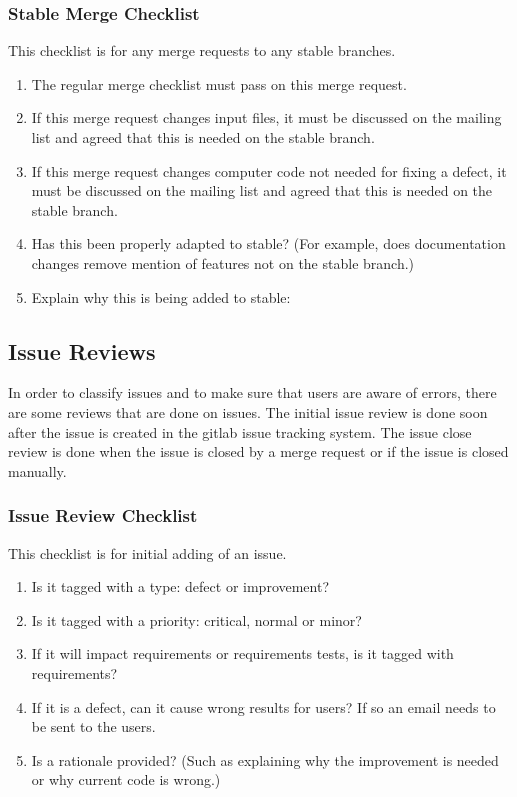 \documentclass{article}
\begin{document}
\subsubsection{Stable Merge Checklist}

This checklist is for any merge requests to any stable branches.

\begin{enumerate}
\item  The regular merge checklist must pass on this merge request.
\item  If this merge request changes input files, it must be discussed on the mailing list and agreed that this is needed on the stable branch.
\item  If this merge request changes computer code not needed for fixing a defect, it must be discussed on the mailing list and agreed that this is needed on the stable branch.
\item  Has this been properly adapted to stable? (For example, does documentation changes remove mention of features not on the stable branch.)
\item  Explain why this is being added to stable:
\end{enumerate}

\subsection{Issue Reviews}

In order to classify issues and to make sure that users are aware of
errors, there are some reviews that are done on issues.  The initial
issue review is done soon after the issue is created in the gitlab
issue tracking system.  The issue close review is done when the issue
is closed by a merge request or if the issue is closed manually.

\subsubsection{Issue Review Checklist}

This checklist is for initial adding of an issue.

\begin{enumerate}
\item  Is it tagged with a type: defect or improvement?
\item  Is it tagged with a priority: critical, normal or minor?
\item  If it will impact requirements or requirements tests, is it tagged with requirements?
\item  If it is a defect, can it cause wrong results for users? If so an email needs to be sent to the users.
\item  Is a rationale provided? (Such as explaining why the improvement is needed or why current code is wrong.)
\end{enumerate}
\end{document}
